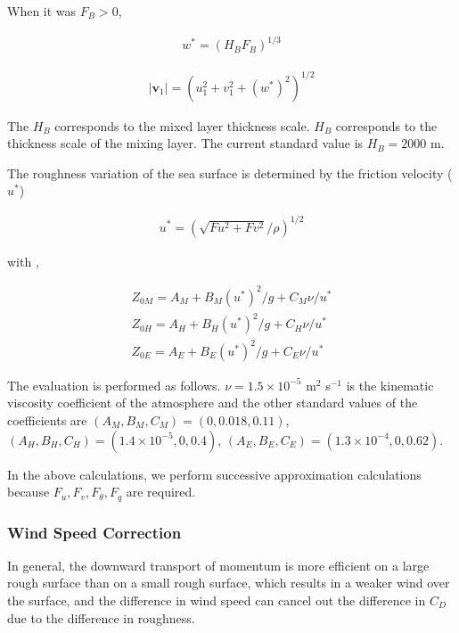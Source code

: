 When it was \(F_B >0\),

\begin{eqnarray}
  w^* = ( H_{B} F_B )^{1/3}
\end{eqnarray}

\begin{eqnarray}
  |{\mathbf{v}}_1| = \left( u_1^2 + v_1^2 + (w^*)^2 \right)^{1/2}
\end{eqnarray}

The \(H_B\) corresponds to the mixed layer thickness scale. \(H_B\)
corresponds to the thickness scale of the mixing layer. The current
standard value is \(H_B=2000\) m.

The roughness variation of the sea surface is determined by the friction
velocity (\(u^*\))

\begin{eqnarray}
  u^* = \left( \sqrt{Fu^2 + Fv^2}/\rho \right)^{1/2}
\end{eqnarray}

with ,

\begin{eqnarray}
  Z_{0M}  =  A_M + B_M (u^*)^2/g + C_M \nu/u^* \\
  Z_{0H}  =  A_H + B_H (u^*)^2/g + C_H \nu/u^* \\
  Z_{0E}  =  A_E + B_E (u^*)^2/g + C_E \nu/u^*
\end{eqnarray}

The evaluation is performed as follows. \(\nu=1.5\times10^{-5}\) m\(^2\)
s\(^{-1}\) is the kinematic viscosity coefficient of the atmosphere and
the other standard values of the coefficients are
\((A_M, B_M, C_M) = (0, 0.018, 0.11)\),
\((A_H, B_H, C_H) = (1.4\times10^{-5}, 0, 0.4)\),
\((A_E, B_E, C_E) = (1.3\times10^{-4}, 0, 0.62)\).

In the above calculations, we perform successive approximation
calculations because \(F_u, F_v, F_\theta, F_q\) are required.

\hypertarget{wind-speed-correction}{%
\subsubsection{Wind Speed Correction}\label{wind-speed-correction}}

In general, the downward transport of momentum is more efficient on a
large rough surface than on a small rough surface, which results in a
weaker wind over the surface, and the difference in wind speed can
cancel out the difference in \(C_D\) due to the difference in roughness.

